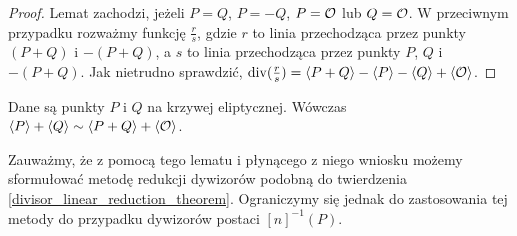 \begin{proof}
Lemat zachodzi, jeżeli $P = Q$, $P = -Q$, $P = \mathcal{O}$ lub $Q = \mathcal{O}$.
W przeciwnym przypadku rozważmy funkcję $\frac{r}{s}$,
gdzie $r$ to linia przechodząca przez punkty $(P+Q)$ i $-(P+Q)$,
a $s$ to linia przechodząca przez punkty $P$, $Q$ i $-(P+Q)$.
Jak nietrudno sprawdzić,
$\operatorname{div}(\frac{r}{s}) = \left\langle P+Q\right\rangle - \left\langle P\right\rangle - \left\langle Q\right\rangle + \left\langle\mathcal{O}\right\rangle$.
\end{proof}

\begin{corollary}\label{divi_sum_reduction_coro}
Dane są punkty $P$ i $Q$ na krzywej eliptycznej.
Wówczas $\left\langle P\right\rangle + \left\langle Q\right\rangle \sim \left\langle P+Q\right\rangle + \left\langle\mathcal{O}\right\rangle$.
\end{corollary}

\noindent
Zauważmy, że z pomocą tego lematu i płynącego z niego wniosku
możemy sformułować metodę redukcji dywizorów
podobną do twierdzenia \ref{divisor_linear_reduction_theorem}.
Ograniczymy się jednak do zastosowania tej metody
do przypadku dywizorów postaci $[n]^{-1}(P)$.

